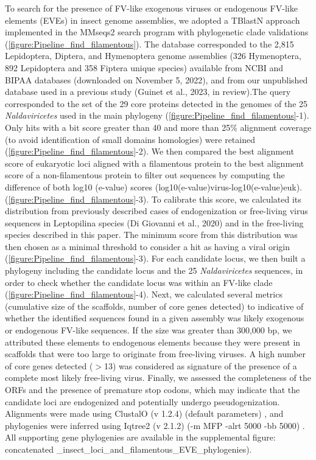 To search for the presence of FV-like exogenous viruses or endogenous FV-like elements (EVEs) in insect genome assemblies, we adopted a TBlastN approach implemented in the MMseqs2 search program \citep{steinegger_mmseqs2_2017} with phylogenetic clade validations (\figurename{\ref{figure:Pipeline_find_filamentous}}). The database corresponded to the 2,815 Lepidoptera, Diptera, and Hymenoptera genome assemblies (326 Hymenoptera, 892 Lepidoptera and 358 Fiptera unique species) available from NCBI and BIPAA databases (downloaded on November 5, 2022), and from our unpublished database used in a previous study (Guinet et al., 2023, in review).The query corresponded to the set of the 29 core proteins detected in the genomes of the 25 \textit{Naldaviricetes} used in the main phylogeny (\figurename{\ref{figure:Pipeline_find_filamentous}}-1). Only hits with a bit score greater than 40 and more than 25\% alignment coverage (to avoid identification of small domains homologies) were retained (\figurename{\ref{figure:Pipeline_find_filamentous}}-2). We then compared the best alignment score of eukaryotic loci aligned with a filamentous protein to the best alignment score of a non-filamentous protein to filter out sequences by computing the difference of both log10 (e-value) scores (log10(e-value)virus-log10(e-value)euk). (\figurename{\ref{figure:Pipeline_find_filamentous}}-3). To calibrate this score, we calculated its distribution from previously described cases of endogenization or free-living virus sequences in Leptopilina species (Di Giovanni et al., 2020) and in the free-living species described in this paper. The minimum score from this distribution was then chosen as a minimal threshold to consider a hit as having a viral origin (\figurename{\ref{figure:Pipeline_find_filamentous}}-3). For each candidate locus, we then built a phylogeny including the candidate locus and the 25 \textit{Naldaviricetes} sequences, in order to check whether the candidate locus was within an FV-like clade (\figurename{\ref{figure:Pipeline_find_filamentous}}-4). Next, we calculated several metrics (cumulative size of the scaffolds, number of core genes detected) to indicative of whether the identified sequences found in a given assembly was likely exogenous or endogenous FV-like sequences.  If the size was greater than 300,000 bp, we attributed these elements to endogenous elements because they were present in scaffolds that were too large to originate from free-living viruses. A high number of core genes detected ($>$13) was considered as signature of the presence of a complete most likely free-living virus. Finally, we assessed the completeness of the ORFs and the presence of premature stop codons, which may indicate that the candidate loci are endogenized and potentially undergo pseudogenization. Alignments were made using ClustalO (v 1.2.4) (default parameters) \citep{sievers_clustal_2018}, and phylogenies were inferred using Iqtree2 (v 2.1.2) (-m MFP -alrt 5000 -bb 5000) \citep{minh_iq-tree_2020}. All supporting gene phylogenies are available in the supplemental figure: concatenated \_insect\_loci\_and\_filamentous\_EVE\_phylogenies). 


